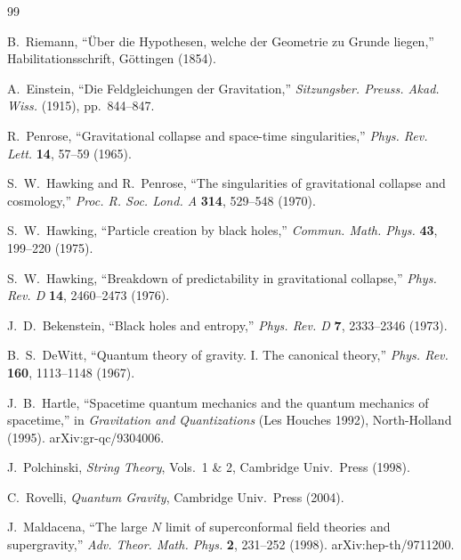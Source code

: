 \documentclass[12pt,a4paper]{article}
\theoremstyle{definition}
\begin{document}
\newpage
\begin{thebibliography}{99}

B.~Riemann, ``\"{U}ber die Hypothesen, welche der Geometrie zu Grunde liegen,'' Habilitationsschrift, G\"{o}ttingen (1854).

A.~Einstein, ``Die Feldgleichungen der Gravitation,'' \textit{Sitzungsber. Preuss. Akad. Wiss.} (1915), pp.~844--847.

R.~Penrose, ``Gravitational collapse and space-time singularities,'' \textit{Phys. Rev. Lett.} \textbf{14}, 57--59 (1965).

S.~W.~Hawking and R.~Penrose, ``The singularities of gravitational collapse and cosmology,'' \textit{Proc. R. Soc. Lond. A} \textbf{314}, 529--548 (1970).

S.~W.~Hawking, ``Particle creation by black holes,'' \textit{Commun. Math. Phys.} \textbf{43}, 199--220 (1975).

S.~W.~Hawking, ``Breakdown of predictability in gravitational collapse,'' \textit{Phys. Rev. D} \textbf{14}, 2460--2473 (1976).

J.~D.~Bekenstein, ``Black holes and entropy,'' \textit{Phys. Rev. D} \textbf{7}, 2333--2346 (1973).

B.~S.~DeWitt, ``Quantum theory of gravity. I. The canonical theory,'' \textit{Phys. Rev.} \textbf{160}, 1113--1148 (1967).

J.~B.~Hartle, ``Spacetime quantum mechanics and the quantum mechanics of spacetime,'' in \textit{Gravitation and Quantizations} (Les Houches 1992), North-Holland (1995). arXiv:gr-qc/9304006.

J.~Polchinski, \textit{String Theory}, Vols.~1 \& 2, Cambridge Univ.~Press (1998).

C.~Rovelli, \textit{Quantum Gravity}, Cambridge Univ.~Press (2004).

J.~Maldacena, ``The large $N$ limit of superconformal field theories and supergravity,'' \textit{Adv. Theor. Math. Phys.} \textbf{2}, 231--252 (1998). arXiv:hep-th/9711200.


\end{thebibliography}
\end{document}
